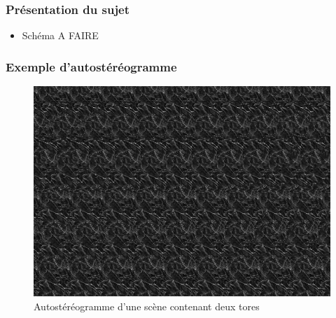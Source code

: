 \documentclass{beamer}
\begin{document}
\begin{frame}
\frametitle{Présentation du sujet}

\begin{itemize}[label=$\bullet$]
\item Schéma A FAIRE
\end{itemize}
\end{frame}


\begin{frame}

\frametitle{Exemple d'autostéréogramme}
\begin{figure}
\centering
\includegraphics[scale=0.4]{autostereogramme1texture.png} %
\caption{Autostéréogramme d'une scène contenant deux tores}
\end{figure}

\end{frame}

\end{document}
